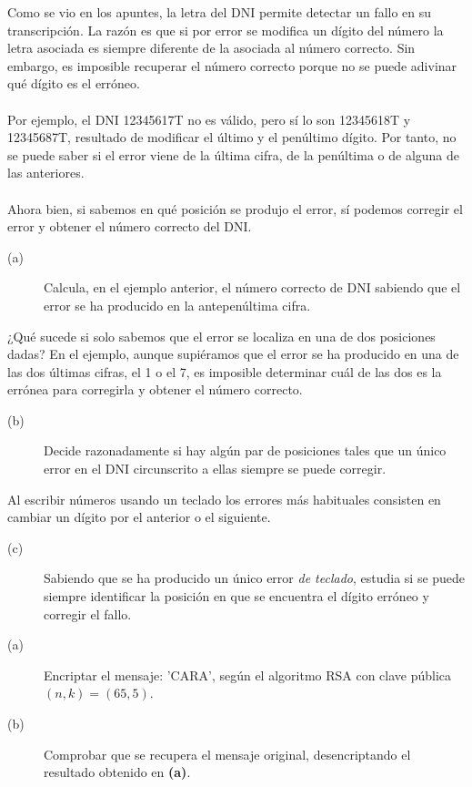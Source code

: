 \documentclass{article}
\begin{document}
\begin{ej}
Como se vio en los apuntes, la letra del DNI permite detectar un fallo en su transcripción. La razón es que si por error se modifica un dígito del número la letra asociada es siempre diferente de la asociada al número correcto. Sin embargo, es imposible recuperar el número correcto porque no se puede adivinar qué dígito es el erróneo. \\ \\
Por ejemplo, el DNI 12345617T no es válido, pero sí lo son 12345618T y 12345687T, resultado de modificar el último y el penúltimo dígito. Por tanto, no se puede saber si el error viene de la última cifra, de la penúltima o de alguna de las anteriores. \\ \\
Ahora bien, si sabemos en qué posición se produjo el error, sí podemos corregir el error y obtener el número correcto del DNI. 
\begin{description}
\item[(a)] Calcula, en el ejemplo anterior, el número correcto de DNI sabiendo que el error se ha producido en la antepenúltima cifra. 
\end{description}
¿Qué sucede si solo sabemos que el error se localiza en una de dos posiciones dadas? En el ejemplo, aunque supiéramos que el error se ha producido en una de las dos últimas cifras, el 1 o el 7, es imposible determinar cuál de las dos es la errónea para corregirla y obtener el número correcto.
\begin{description}
\item[(b)] Decide razonadamente si hay algún par de posiciones tales que un único error en el DNI circunscrito a ellas siempre se puede corregir. 
\end{description}
Al escribir números usando un teclado los errores más habituales consisten en cambiar un dígito por el anterior o el siguiente.
\begin{description}
	\item[(c)] Sabiendo que se ha producido un único error \textit{de teclado}, estudia si se puede siempre identificar la posición en que se encuentra el dígito erróneo y corregir el fallo. 
\end{description}
\end{ej}

\begin{ej}
\begin{description}
\item[(a)] Encriptar el mensaje: 'CARA', según el algoritmo RSA con clave pública $\displaystyle \left(n,k\right) = \left(65,5\right) $.
\item[(b)] Comprobar que se recupera el mensaje original, desencriptando el resultado obtenido en \textbf{(a)}. 
\end{description}
\end{ej}
\end{document}
